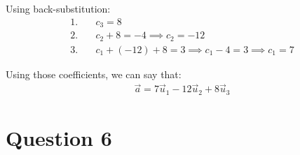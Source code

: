 \documentclass{article}
\begin{document}
Using back-substitution:
\begin{align*}
	1. \quad & c_{3} = 8                                                       \\
	2. \quad & c_{2} + 8 = -4 \implies c_{2} = -12                             \\
	3. \quad & c_{1} + (-12) + 8 = 3 \implies c_{1} - 4 = 3 \implies c_{1} = 7
\end{align*}

Using those coefficients, we can say that:
\begin{align*}
	\vec{a} = 7\vec{u}_{1} - 12\vec{u}_{2} + 8\vec{u}_{3}
\end{align*}

\pagebreak


\section{Question 6}
\end{document}
